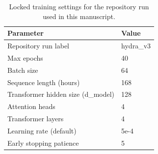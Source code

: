 \begin{table}
\centering
\caption{Locked training settings for the repository run used in this manuscript.}
\small
\begin{tabular}{ll}
\toprule
\textbf{Parameter} & \textbf{Value} \\
\midrule
Repository run label & hydra\_v3 \\
Max epochs & 40 \\
Batch size & 64 \\
Sequence length (hours) & 168 \\
Transformer hidden size (d\_model) & 128 \\
Attention heads & 4 \\
Transformer layers & 4 \\
Learning rate (default) & 5e-4 \\
Early stopping patience & 5 \\
\bottomrule
\end{tabular}
\label{tab:training_config}
\end{table}
